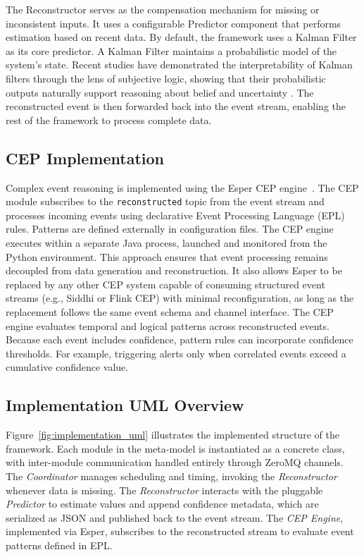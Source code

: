 The Reconstructor serves as the compensation mechanism for missing or inconsistent inputs. It uses a configurable Predictor component that performs estimation based on recent data. By default, the framework uses a Kalman Filter as its core predictor. A Kalman Filter maintains a probabilistic model of the system’s state. Recent studies have demonstrated the interpretability of Kalman filters through the lens of subjective logic, showing that their probabilistic outputs naturally support reasoning about belief and uncertainty \cite{griebel2020kalman, kang2021some}. The reconstructed event is then forwarded back into the event stream, enabling the rest of the framework to process complete data.


\subsection{CEP Implementation}
Complex event reasoning is implemented using the Esper CEP engine~\cite{esper_reference}.
The CEP module subscribes to the \texttt{reconstructed} topic from the event stream and processes incoming events using declarative Event Processing Language (EPL) rules.
Patterns are defined externally in configuration files.
The CEP engine executes within a separate Java process, launched and monitored from the Python environment.
This approach ensures that event processing remains decoupled from data generation and reconstruction.
It also allows Esper to be replaced by any other CEP system capable of consuming structured event streams (e.g., Siddhi or Flink CEP) with minimal reconfiguration, as long as the replacement follows the same event schema and channel interface.
The CEP engine evaluates temporal and logical patterns across reconstructed events. Because each event includes confidence, pattern rules can incorporate confidence thresholds. For example, triggering alerts only when correlated events exceed a cumulative confidence value.


\subsection{Implementation UML Overview}\label{subsec:arc-framework-uml}

\label{sec:implementation-uml}

Figure~\ref{fig:implementation_uml} illustrates the implemented structure of the framework.
Each module in the meta-model is instantiated as a concrete class, with inter-module communication handled entirely through ZeroMQ channels.
The \textit{Coordinator} manages scheduling and timing, invoking the \textit{Reconstructor} whenever data is missing.
The \textit{Reconstructor} interacts with the pluggable \textit{Predictor} to estimate values and append confidence metadata, which are serialized as JSON and published back to the event stream.
The \textit{CEP Engine}, implemented via Esper, subscribes to the reconstructed stream to evaluate event patterns defined in EPL.

